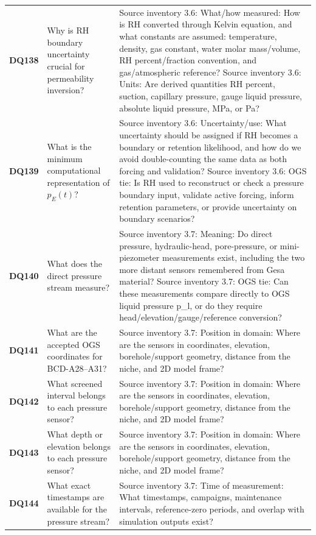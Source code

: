 \begin{longtable}{@{}L{0.09\textwidth} L{0.31\textwidth} L{0.52\textwidth}@{}}
\addlinespace[0.18em]
\textbf{DQ138} & Why is RH boundary uncertainty crucial for permeability inversion? & Source inventory 3.6: What/how measured: How is RH converted through Kelvin equation, and what constants are assumed: temperature, density, gas constant, water molar mass/volume, RH percent/fraction convention, and gas/atmospheric reference? Source inventory 3.6: Units: Are derived quantities RH percent, suction, capillary pressure, gauge liquid pressure, absolute liquid pressure, MPa, or Pa?\\
\addlinespace[0.18em]
\textbf{DQ139} & What is the minimum computational representation of \(p_E(t)\)? & Source inventory 3.6: Uncertainty/use: What uncertainty should be assigned if RH becomes a boundary or retention likelihood, and how do we avoid double-counting the same data as both forcing and validation? Source inventory 3.6: OGS tie: Is RH used to reconstruct or check a pressure boundary input, validate active forcing, inform retention parameters, or provide uncertainty on boundary scenarios?\\
\addlinespace[0.18em]
\textbf{DQ140} & What does the direct pressure stream measure? & Source inventory 3.7: Meaning: Do direct pressure, hydraulic-head, pore-pressure, or mini-piezometer measurements exist, including the two more distant sensors remembered from Gesa material? Source inventory 3.7: OGS tie: Can these measurements compare directly to OGS liquid pressure p\_l, or do they require head/elevation/gauge/reference conversion?\\
\addlinespace[0.18em]
\textbf{DQ141} & What are the accepted OGS coordinates for BCD-A28--A31? & Source inventory 3.7: Position in domain: Where are the sensors in coordinates, elevation, borehole/support geometry, distance from the niche, and 2D model frame?\\
\addlinespace[0.18em]
\textbf{DQ142} & What screened interval belongs to each pressure sensor? & Source inventory 3.7: Position in domain: Where are the sensors in coordinates, elevation, borehole/support geometry, distance from the niche, and 2D model frame?\\
\addlinespace[0.18em]
\textbf{DQ143} & What depth or elevation belongs to each pressure sensor? & Source inventory 3.7: Position in domain: Where are the sensors in coordinates, elevation, borehole/support geometry, distance from the niche, and 2D model frame?\\
\addlinespace[0.18em]
\textbf{DQ144} & What exact timestamps are available for the pressure stream? & Source inventory 3.7: Time of measurement: What timestamps, campaigns, maintenance intervals, reference-zero periods, and overlap with simulation outputs exist?\\

\end{longtable}
